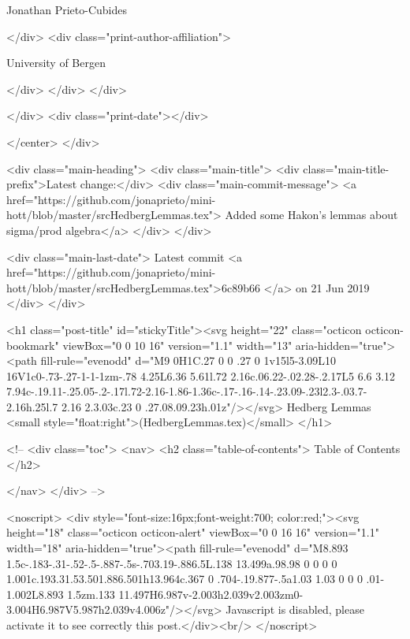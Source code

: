                   Jonathan Prieto-Cubides
                
              </div>
              <div class="print-author-affiliation">
                
                  University of Bergen
                
                </div>
            </div>
          </div>
          
          
        </div>
        <div class="print-date"></div>
        
        
    </center>
  </div>

  
  <div class="main-heading">
    <div class="main-title">
      <div class="main-title-prefix">Latest change:</div>
      <div class="main-commit-message">
            <a href="https://github.com/jonaprieto/mini-hott/blob/master/srcHedbergLemmas.tex">
              Added some Hakon's lemmas about sigma/prod algebra</a>
      </div>
    </div>

    <div class="main-last-date">
      Latest commit <a href="https://github.com/jonaprieto/mini-hott/blob/master/srcHedbergLemmas.tex">6c89b66 </a> on  21 Jun 2019
    </div>
  </div>
  

  <h1 class="post-title" id="stickyTitle"><svg height="22" class="octicon octicon-bookmark" viewBox="0 0 10 16" version="1.1" width="13" aria-hidden="true"><path fill-rule="evenodd" d="M9 0H1C.27 0 0 .27 0 1v15l5-3.09L10 16V1c0-.73-.27-1-1-1zm-.78 4.25L6.36 5.61l.72 2.16c.06.22-.02.28-.2.17L5 6.6 3.12 7.94c-.19.11-.25.05-.2-.17l.72-2.16-1.86-1.36c-.17-.16-.14-.23.09-.23l2.3-.03.7-2.16h.25l.7 2.16 2.3.03c.23 0 .27.08.09.23h.01z"/></svg> Hedberg Lemmas <small style="float:right">(HedbergLemmas.tex)</small>
  </h1>

  <!-- 
  <div class="toc">
    <nav>
    <h2 class="table-of-contents"> Table of Contents </h2>
      

    </nav>
  </div>
   -->

  <noscript>
  <div style="font-size:16px;font-weight:700; color:red;"><svg height="18" class="octicon octicon-alert" viewBox="0 0 16 16" version="1.1" width="18" aria-hidden="true"><path fill-rule="evenodd" d="M8.893 1.5c-.183-.31-.52-.5-.887-.5s-.703.19-.886.5L.138 13.499a.98.98 0 0 0 0 1.001c.193.31.53.501.886.501h13.964c.367 0 .704-.19.877-.5a1.03 1.03 0 0 0 .01-1.002L8.893 1.5zm.133 11.497H6.987v-2.003h2.039v2.003zm0-3.004H6.987V5.987h2.039v4.006z"/></svg> Javascript is disabled, please activate it to see correctly this post.</div><br/>
  </noscript>

